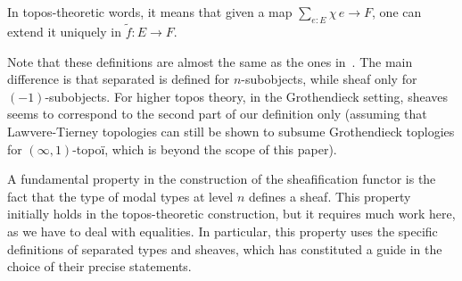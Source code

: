 \documentclass[preprint,9pt,numbers]{sigplanconf}
\begin{document}
In topos-theoretic words, it means that given a map $\sum_{e:E}
\chi\, e\to F$, one can
extend it uniquely in $\tilde f:E \to F$.

Note that these definitions are almost the same as the ones
in~\cite{maclanemoerdijk}. The main difference is that {separated}
is defined for $n$-subobjects, while {sheaf} only for
$(-1)$-subobjects.
%
For higher topos theory, in the Grothendieck setting, sheaves seems
to correspond to the second part of our definition only (assuming that
Lawvere-Tierney topologies can still be shown to subsume Grothendieck
toplogies for $(\infty,1)$-topoï, which is beyond the scope of this paper).
%

A fundamental property in the construction of the sheafifica\-tion
functor is the fact that the type of modal types at level $n$ defines
a sheaf.
%
This property initially holds in the topos-theoretic construction, but
it requires much work here, as we have to deal with equalities. In
particular, this property uses the specific definitions
of separated types and sheaves, which has constituted a guide in the
choice of their precise statements. 
\end{document}
